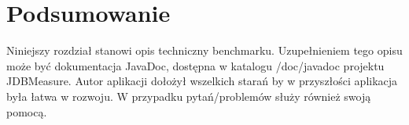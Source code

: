 \section{Podsumowanie}
Niniejszy rozdział stanowi opis techniczny benchmarku. Uzupełnieniem tego opisu może być dokumentacja JavaDoc,
dostępna w katalogu /doc/javadoc projektu JDBMeasure. Autor aplikacji dołożył wszelkich starań by w przyszłości
aplikacja była łatwa w rozwoju. W przypadku pytań/problemów służy również swoją pomocą.
